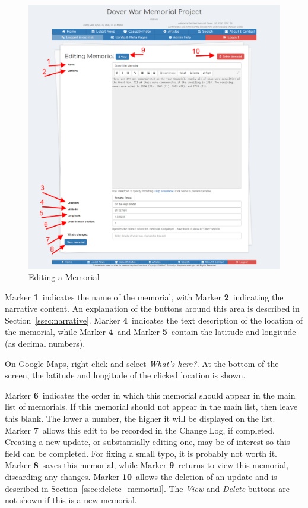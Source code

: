 \documentclass[12pt]{article}
\newcommand{\marker}[1]{Marker \color{red}\textbf{#1}\color{black}}
\begin{document}
\begin{figure}[h]
  \centering
 \includegraphics[width=.9\textwidth]{pics/edit_memorial.png}
	\caption{Editing a Memorial}\label{fig:edit_memorial}
\end{figure}

\marker{1}\ indicates the name of the memorial, with \marker{2}\ indicating the narrative content. An explanation of the buttons around this area is described in Section~\ref{ssec:narrative}. \marker{4}\ indicates the text description of the location of the memorial, while \marker{4}\ and \marker{5}\ contain the latitude and longitude (as decimal numbers). 

\begin{infoBox}
On Google Maps, right click and select \textit{What's here?}. At the bottom of the screen, the latitude and longitude of the clicked location is shown.
\end{infoBox}

\marker{6}\ indicates the order in which this memorial should appear in the main list of memorials. If this memorial should not appear in the main list, then leave this blank. The lower a number, the higher it will be displayed on the list. \marker{7}\ allows this edit to be recorded in the Change Log, if completed. Creating a new update, or substantially editing one, may be of interest so this field can be completed. For fixing a small typo, it is probably not worth it. \marker{8}\ saves this memorial, while \marker{9}\ returns to view this memorial, discarding any changes. \marker{10}\ allows the deletion of an update and is described in Section~\ref{ssec:delete_memorial}. The \textit{View} and \textit{Delete} buttons are not shown if this is a new memorial.
\end{document}
